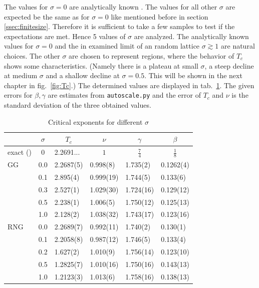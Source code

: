     The values for
    \(\sigma = 0\) are analytically known \cite{Pelissetto2002}. The
    values for all other \(\sigma\) are expected be the same as for
    \(\sigma = 0\) like mentioned before in section \ref{ssec:finitesize}.
    Therefore it is sufficient to take a few samples to test if the
    expectations are met. Hence 5 values of \(\sigma\) are analyzed.
    The analytically known values for \(\sigma = 0\) and the in \cite{Janke1994}
    examined limit of an random lattice \(\sigma \gtrsim 1\) are natural
    choices.
    The other \(\sigma\) are chosen to represent regions, where the behavior of
    \(T_c\) shows some characteristics. (Namely there is a plateau at small
    \(\sigma\), a steep decline at medium \(\sigma\) and a shallow
    decline at \(\sigma = 0.5\). This will be shown in the next
    chapter in fig.\ \ref{fig:Tc}.)
    The determined values are displayed in tab.\ \ref{tab:critExp}.
    The given errors for \(\beta, \gamma\) are estimates from \texttt{autoscale.py}
    and the error of \(T_c\) and \(\nu\) is the standard deviation of the
    three obtained values.\\
    \begin{table}[htbp]
        \center
        \begin{tabular}{l l l l l l}
            \toprule
             & \multicolumn{1}{c}{\(\sigma\)} & \multicolumn{1}{c}{\(T_c\)} & \multicolumn{1}{c}{\(\nu\)} & \multicolumn{1}{c}{\(\gamma\)} & \multicolumn{1}{c}{\(\beta\)}\\
            \midrule
            exact (\cite[p. 59]{Pelissetto2002}) & \multicolumn{1}{c}{\(0\)} & 2.2691... & \multicolumn{1}{c}{\(1\)} & \multicolumn{1}{c}{\(\frac{7}{4}\)} & \multicolumn{1}{c}{\(\frac{1}{8}\)}\\
            \midrule
            GG           & 0.0 & 2.2687(5)& 0.998(8) & 1.735(2) & 0.1262(4)\\
                         & 0.1 & 2.895(4) & 0.999(19)& 1.744(5) & 0.133(6) \\
                         & 0.3 & 2.527(1) & 1.029(30)& 1.724(16)& 0.129(12)\\
                         & 0.5 & 2.238(1) & 1.006(5) & 1.750(12)& 0.125(13)\\
                         & 1.0 & 2.128(2) & 1.038(32)& 1.743(17)& 0.123(16)\\
            \midrule
            RNG          & 0.0 & 2.2689(7)& 0.992(11)& 1.740(2) & 0.130(1) \\
                         & 0.1 & 2.2058(8)& 0.987(12)& 1.746(5) & 0.133(4) \\
                         & 0.2 & 1.627(2) & 1.010(9) & 1.756(14)& 0.123(10)\\
                         & 0.5 & 1.2825(7)& 1.010(16)& 1.750(16)& 0.143(13)\\
                         & 1.0 & 1.2123(3)& 1.013(6) & 1.758(16)& 0.138(13)\\
            \bottomrule
        \end{tabular}
        \caption[Critical Exponents for Different $\sigma$]{Critical exponents for different $\sigma$}
        \label{tab:critExp}
    \end{table}\\
